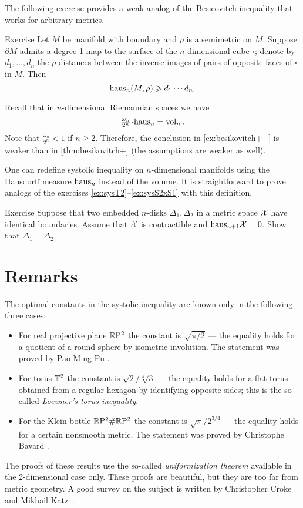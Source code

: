 The following exercise provides a weak analog of the Besicovitch inequality that works for arbitrary metrics.

\begin{thm}{Exercise}\label{ex:besikovitch++}
Let $M$ be manifold with boundary and $\rho$ is a semimetric on $M$.
Suppose $\partial M$ admits a degree 1 map to the surface of the $n$-dimensional cube $\square$;
denote by $d_1,\dots, d_n$ the $\rho$-distances between the inverse images of pairs of opposite faces of $\square$ in $M$.
Then 
\[\mathrm{haus}_n(M,\rho)\geqslant d_1\cdots d_n.\]
\end{thm}


Recall that in $n$-dimensional Riemannian spaces we have 
\[\tfrac{\omega_n}{2^n}\cdot\haus_n=\vol_n.\]
Note that $\tfrac{\omega_n}{2^n}<1$ if $n\ge 2$.
Therefore, the conclusion in \ref{ex:besikovitch++} is weaker than in \ref{thm:besikovitch+} (the assumptions are weaker as well).

One can redefine systolic inequality on $n$-dimensional manifolds using the Hausdorff measure $\mathrm{haus}_n$ instead of the volume.
It is straightforward to prove analogs of the exercises \ref{ex:sysT2}--\ref{ex:sysS2xS1} with this definition.

\begin{thm}{Exercise}\label{ex:2top-discs}
Suppose that two embedded $n$-disks $\Delta_1,\Delta_2$ in a metric space $\mathcal{X}$ have identical boundaries.
Assume that $\mathcal{X}$ is contractible and $\mathrm{haus}_{n+1}\mathcal{X}=0$.
Show that $\Delta_1=\Delta_2$.
\end{thm}

\section{Remarks}\label{sec:besicovitch-remarks}

The optimal constants in the systolic inequality are known only in the following three cases:
\begin{itemize}
\item For real projective plane $\mathbb{R}\mathrm{P}^2$ the constant is $\sqrt{\pi/2}$ --- the equality holds for a quotient of a round sphere by isometric involution. The statement was proved by Pao Ming Pu \cite{pu}.\label{page:pu}
\item For torus $\mathbb{T}^2$ the constant is $\sqrt{2}/\sqrt[4]{3}$ --- the equality holds for a flat torus obtained from a regular hexagon by identifying opposite sides; this is the so-called \emph{Loewner's torus inequality}.
\item For the Klein bottle $\mathbb{R}\mathrm{P}^2\#\mathbb{R}\mathrm{P}^2$  the constant is $\sqrt{\pi}/2^{3/4}$ --- the equality holds for a certain nonsmooth metric.
The statement was proved by Christophe Bavard \cite{bavard}.
\end{itemize}
The proofs of these results use the so-called {}\emph{uniformization theorem}   available in the 2-dimensional case only.
These proofs are beautiful, but they are too far from metric geometry.
A good survey on the subject is written by Christopher Croke and Mikhail Katz \cite{croke-katz}.

